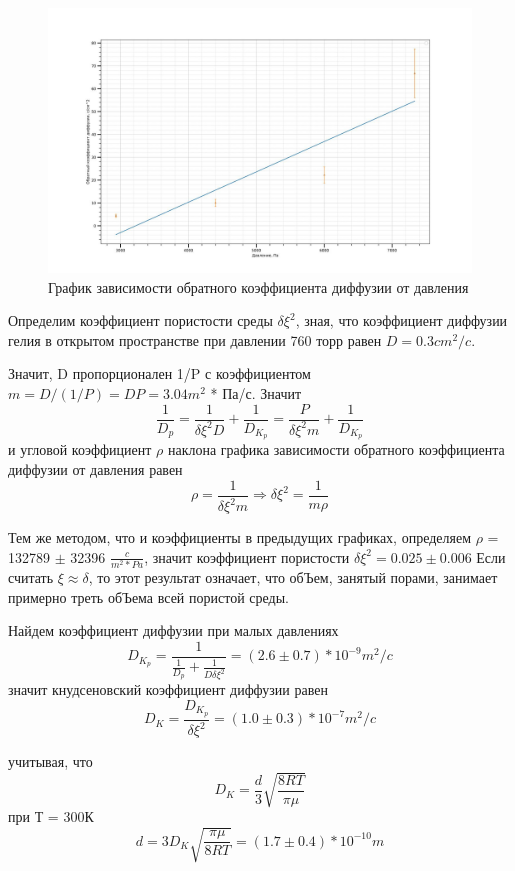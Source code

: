 \documentclass[a4paper,12pt]{article}
\begin{document}
\begin{figure}[H]
  \begin{center}
    \includegraphics[width=16cm]{graphikD.jpg}
    \caption{График зависимости обратного коэффициента диффузии от давления}
    \label{fig:}
  \end{center}
\end{figure}

Определим коэффициент пористости среды $ \delta \xi^{2} $, зная, что коэффициент диффузии гелия в открытом пространстве при давлении 760 торр равен $ D = 0.3  cm^{2}/c$.


Значит, D пропорционален 1/P с коэффициентом $ m = D/(1/P) = DP = 3.04 m^{2}$ * Па/с.
Значит
\[ \frac{1}{D_p}  = \frac{1}{\delta \xi^{2} D} + \frac{1}{D_{K_{p}}} =\frac{P}{\delta \xi^{2} m} + \frac{1}{D_{K_{p}}}  \]
и угловой коэффициент  $\rho$ наклона графика зависимости обратного коэффициента диффузии от давления равен 
\[ \rho = \frac{1}{\delta \xi^{2} m} \Rightarrow \delta \xi^{2} = \frac{1}{m\rho} \]



Тем же методом, что и коэффициенты в предыдущих графиках, определяем $\rho $ = 132789 $\pm $ 32396 $\frac{c}{m^{2}*Pa}$, значит коэффициент пористости $ \delta \xi^{2} = 0.025\pm 0.006 $ Если считать $\xi \approx \delta $, то этот результат означает, что обЪем, занятый порами, занимает примерно треть обЪема всей пористой среды.

Найдем коэффициент диффузии при малых давлениях
\[ D_{K_p} = \frac{1}{\frac{1}{D_p}+\frac{1}{D\delta \xi^{2}}} = (2.6\pm  0.7 )* 10^{-9} m^{2}/c\]
значит кнудсеновский коэффициент диффузии равен
\[ D_K = \frac{D_{K_p}}{\delta \xi^{2}} = (1.0\pm 0.3) * 10^{-7} m^{2}/c\]

учитывая, что
\[ D_K = \frac{d}{3} \sqrt{\frac{8RT}{\pi \mu }}\]
при Т = 300К
\[ d = 3D_K\sqrt{\frac{\pi \mu }{8RT}} = (1.7\pm 0.4) * 10^{-10} m \]
\end{document}

